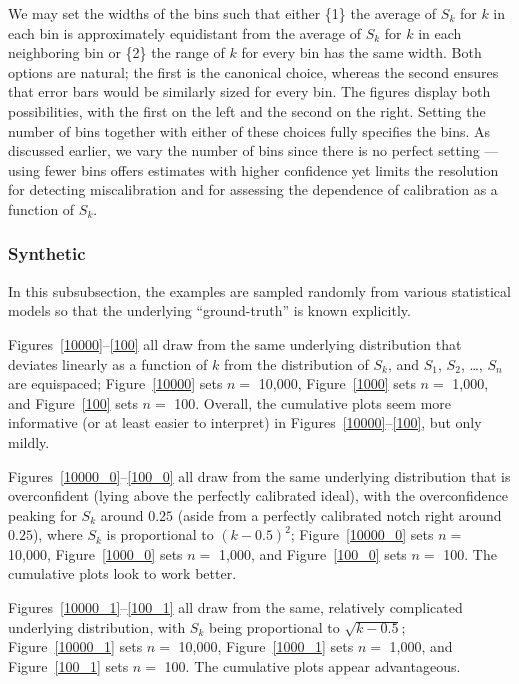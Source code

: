 \documentclass{article}
\begin{document}
We may set the widths of the bins such that either
\{1\} the average of $S_k$ for $k$ in each bin is approximately equidistant
from the average of $S_k$ for $k$ in each neighboring bin or
\{2\} the range of $k$ for every bin has the same width.
Both options are natural; the first is the canonical choice,
whereas the second ensures that error bars would be similarly sized
for every bin. The figures display both possibilities,
with the first on the left and the second on the right.
Setting the number of bins together with either of these choices
fully specifies the bins. As discussed earlier, we vary the number of bins
since there is no perfect setting --- using fewer bins offers estimates
with higher confidence yet limits the resolution for detecting miscalibration
and for assessing the dependence of calibration as a function of $S_k$.


\subsubsection{Synthetic}
\label{asynthetic}

In this subsubsection, the examples are sampled randomly
from various statistical models so that the underlying ``ground-truth''
is known explicitly.

Figures~\ref{10000}--\ref{100} all draw from the same underlying distribution
that deviates linearly as a function of $k$ from the distribution of $S_k$,
and $S_1$, $S_2$, \dots, $S_n$ are equispaced;
Figure~\ref{10000} sets $n =$ 10,000, Figure~\ref{1000} sets $n =$ 1,000,
and Figure~\ref{100} sets $n =$ 100.
Overall, the cumulative plots seem more informative
(or at least easier to interpret) in Figures~\ref{10000}--\ref{100},
but only mildly.

Figures~\ref{10000_0}--\ref{100_0} all draw
from the same underlying distribution that is overconfident
(lying above the perfectly calibrated ideal),
with the overconfidence peaking for $S_k$ around $0.25$
(aside from a perfectly calibrated notch right around $0.25$),
where $S_k$ is proportional to $(k-0.5)^2$;
Figure~\ref{10000_0} sets $n =$ 10,000, Figure~\ref{1000_0} sets $n =$ 1,000,
and Figure~\ref{100_0} sets $n =$ 100.
The cumulative plots look to work better.

Figures~\ref{10000_1}--\ref{100_1} all draw
from the same, relatively complicated underlying distribution,
with $S_k$ being proportional to $\sqrt{k-0.5}$;
Figure~\ref{10000_1} sets $n =$ 10,000, Figure~\ref{1000_1} sets $n =$ 1,000,
and Figure~\ref{100_1} sets $n =$ 100.
The cumulative plots appear advantageous.
\end{document}
